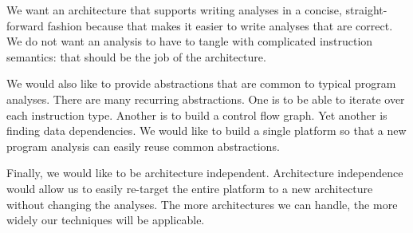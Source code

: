We want an architecture that supports writing analyses in a concise,
straight-forward fashion because that makes it easier to write
analyses that are correct.  We do not want an analysis to have to
tangle with complicated instruction semantics: that should be the
job of the architecture.  

We would also like to provide abstractions that are common to typical
program analyses. There are many recurring abstractions. One is to be
able to iterate over each instruction type. Another is to build a
control flow graph.  Yet another is finding data dependencies. We
would like to build a single platform so that a new program analysis
can easily reuse common abstractions.

Finally, we would like to be architecture independent.  Architecture
independence would allow us to easily re-target the entire platform to
a new architecture without changing the analyses.  The more
architectures we can handle, the more widely our techniques will be
applicable.








